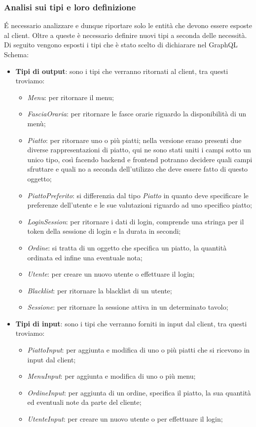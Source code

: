 \subsubsection*{Analisi sui tipi e loro definizione}
É necessario analizzare e dunque riportare solo le entità che devono essere esposte al client. Oltre a queste è necessario definire nuovi tipi a seconda delle necessità. Di seguito vengono esposti i tipi che è stato scelto di dichiarare nel GraphQL Schema:
\begin{itemize}
  \item \textbf{Tipi di output}: sono i tipi che verranno ritornati al client, tra questi troviamo:
  \begin{itemize}
    \item \textit{Menu}: per ritornare il menu;
    \item \textit{FasciaOraria}: per ritornare le fasce orarie riguardo la disponibilità di un menù;
    \item \textit{Piatto}: per ritornare uno o più piatti; nella versione erano presenti due diverse rappresentazioni di piatto, qui ne sono stati uniti i campi sotto un unico tipo, così facendo backend e frontend potranno decidere quali campi sfruttare e quali no a seconda dell'utilizzo che deve essere fatto di questo oggetto;
    \item \textit{PiattoPreferito}: si differenzia dal tipo \textit{Piatto} in quanto deve specificare le preferenze dell'utente e le sue valutazioni riguardo ad uno specifico piatto;
    \item \textit{LoginSession}: per ritornare i dati di login, comprende una stringa per il token della sessione di login e la durata in secondi;
    \item \textit{Ordine}: si tratta di un oggetto che specifica un piatto, la quantità ordinata ed infine una eventuale nota;
    \item \textit{Utente}: per creare un nuovo utente o effettuare il login;
    \item \textit{Blacklist}: per ritornare la blacklist di un utente;
    \item \textit{Sessione}: per ritornare la sessione attiva in un determinato tavolo;
  \end{itemize}
  \item \textbf{Tipi di input}: sono i tipi che verranno forniti in input dal client, tra questi troviamo:
  \begin{itemize}
    \item \textit{PiattoInput}: per aggiunta e modifica di uno o più piatti che si ricevono in input dal client;
    \item \textit{MenuInput}: per aggiunta e modifica di uno o più menu;
    \item \textit{OrdineInput}: per aggiunta di un ordine, specifica il piatto, la sua quantità ed eventuali note da parte del cliente;
    \item \textit{UtenteInput}: per creare un nuovo utente o per effettuare il login;
  \end{itemize}
\end{itemize}
